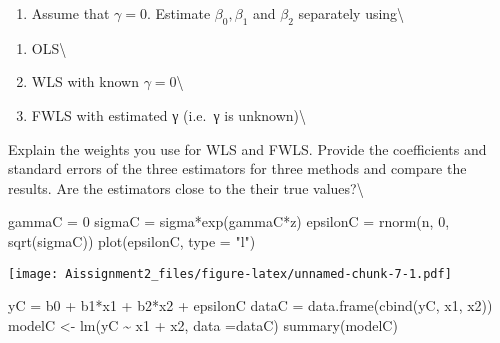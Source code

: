 \documentclass[
]{article}
\newenvironment{Shaded}{\begin{snugshade}}{\end{snugshade}}
\newcommand{\AttributeTok}[1]{\textcolor[rgb]{0.77,0.63,0.00}{#1}}
\newcommand{\DecValTok}[1]{\textcolor[rgb]{0.00,0.00,0.81}{#1}}
\newcommand{\FunctionTok}[1]{\textcolor[rgb]{0.00,0.00,0.00}{#1}}
\newcommand{\NormalTok}[1]{#1}
\newcommand{\OtherTok}[1]{\textcolor[rgb]{0.56,0.35,0.01}{#1}}
\newcommand{\SpecialCharTok}[1]{\textcolor[rgb]{0.00,0.00,0.00}{#1}}
\newcommand{\StringTok}[1]{\textcolor[rgb]{0.31,0.60,0.02}{#1}}
\providecommand{\tightlist}{%
  \setlength{\itemsep}{0pt}\setlength{\parskip}{0pt}}
\begin{document}
\begin{enumerate}
\def\labelenumi{\alph{enumi})}
\setcounter{enumi}{2}
\tightlist
\item
  Assume that \(\gamma = 0\). Estimate \(\beta_0, \beta_1\) and
  \(\beta_2\) separately using\textbackslash{}
\end{enumerate}

\begin{enumerate}
\def\labelenumi{\arabic{enumi}.}
\tightlist
\item
  OLS\textbackslash{}
\item
  WLS with known \(\gamma = 0\)\textbackslash{}
\item
  FWLS with estimated γ (i.e.~γ is unknown)\textbackslash{}
\end{enumerate}

Explain the weights you use for WLS and FWLS. Provide the coefficients
and standard errors of the three estimators for three methods and
compare the results. Are the estimators close to the their true
values?\textbackslash{}

\begin{Shaded}
\begin{Highlighting}[]
\NormalTok{gammaC }\OtherTok{=} \DecValTok{0}
\NormalTok{sigmaC }\OtherTok{=}\NormalTok{ sigma}\SpecialCharTok{*}\FunctionTok{exp}\NormalTok{(gammaC}\SpecialCharTok{*}\NormalTok{z)}
\NormalTok{epsilonC }\OtherTok{=} \FunctionTok{rnorm}\NormalTok{(n, }\DecValTok{0}\NormalTok{, }\FunctionTok{sqrt}\NormalTok{(sigmaC))}
\FunctionTok{plot}\NormalTok{(epsilonC, }\AttributeTok{type =} \StringTok{"l"}\NormalTok{)}
\end{Highlighting}
\end{Shaded}

\texttt{[image: Aissignment2\_files/figure-latex/unnamed-chunk-7-1.pdf]}

\begin{Shaded}
\begin{Highlighting}[]
\NormalTok{yC }\OtherTok{=}\NormalTok{ b0 }\SpecialCharTok{+}\NormalTok{ b1}\SpecialCharTok{*}\NormalTok{x1 }\SpecialCharTok{+}\NormalTok{ b2}\SpecialCharTok{*}\NormalTok{x2 }\SpecialCharTok{+}\NormalTok{ epsilonC}
\NormalTok{dataC }\OtherTok{=} \FunctionTok{data.frame}\NormalTok{(}\FunctionTok{cbind}\NormalTok{(yC, x1, x2))}
\NormalTok{modelC }\OtherTok{\textless{}{-}} \FunctionTok{lm}\NormalTok{(yC }\SpecialCharTok{\textasciitilde{}}\NormalTok{ x1 }\SpecialCharTok{+}\NormalTok{ x2, }\AttributeTok{data =}\NormalTok{dataC)}
\FunctionTok{summary}\NormalTok{(modelC)}
\end{Highlighting}
\end{Shaded}
\end{document}
